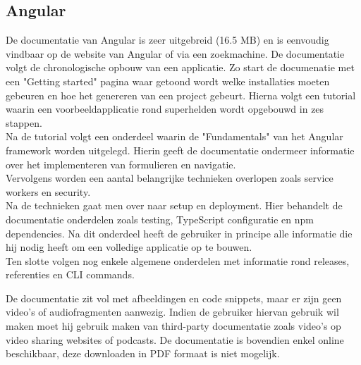 \subsection{Angular}
De documentatie van Angular \autocite{Angular2019} is zeer uitgebreid (16.5 MB) en is eenvoudig vindbaar op de website van Angular of via een zoekmachine. De documentatie volgt de chronologische opbouw van een applicatie. Zo start de documenatie met een "Getting started" pagina waar getoond wordt welke installaties moeten gebeuren en hoe het genereren van een project gebeurt. 
Hierna volgt een tutorial waarin een voorbeeldapplicatie rond superhelden wordt opgebouwd in zes stappen. \\ Na de tutorial volgt een onderdeel waarin de "Fundamentals" van het Angular framework worden uitgelegd. Hierin geeft de documentatie ondermeer informatie over het implementeren van formulieren en navigatie. \\
Vervolgens worden een aantal belangrijke technieken overlopen zoals service workers en security.  \\
Na de technieken gaat men over naar setup en deployment. Hier behandelt de documentatie onderdelen zoals testing, TypeScript configuratie en npm dependencies. Na dit onderdeel heeft de gebruiker in principe alle informatie die hij nodig heeft om een volledige applicatie op te bouwen.\\
Ten slotte volgen nog enkele algemene onderdelen met informatie rond releases, referenties en CLI commands. 

De documentatie zit vol met afbeeldingen en code snippets, maar er zijn geen video's of audiofragmenten aanwezig. Indien de gebruiker hiervan gebruik wil maken moet hij gebruik maken van third-party documentatie zoals video's op video sharing websites of podcasts. De documentatie is bovendien enkel online beschikbaar, deze downloaden in PDF formaat is niet mogelijk. 

